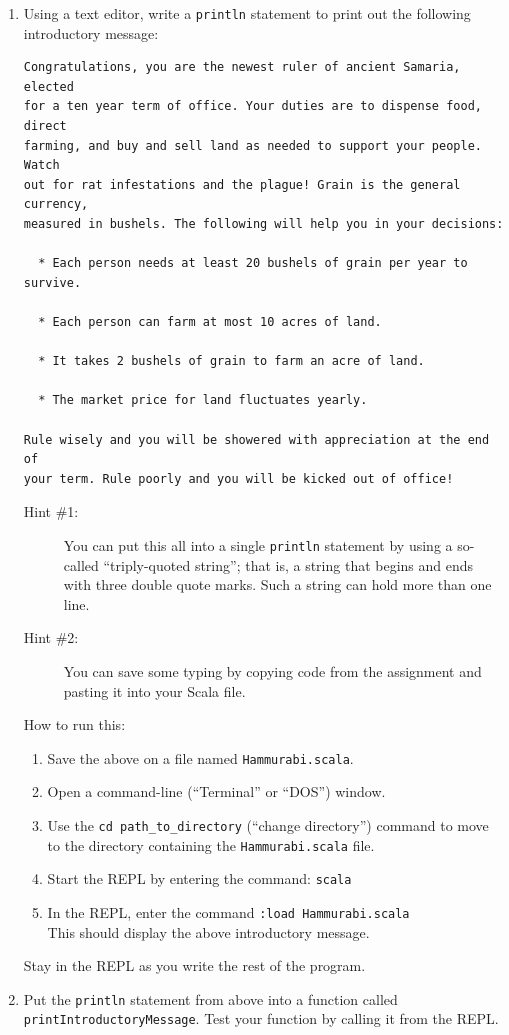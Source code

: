 \documentclass[12pt,a4paper,times]{article}
\begin{document}
\begin{enumerate}
\item
  Using a text editor, write a \texttt{println} statement to print out
  the following introductory message:

\begin{Verbatim}
Congratulations, you are the newest ruler of ancient Samaria, elected
for a ten year term of office. Your duties are to dispense food, direct
farming, and buy and sell land as needed to support your people. Watch
out for rat infestations and the plague! Grain is the general currency,
measured in bushels. The following will help you in your decisions:

  * Each person needs at least 20 bushels of grain per year to survive.

  * Each person can farm at most 10 acres of land.

  * It takes 2 bushels of grain to farm an acre of land.

  * The market price for land fluctuates yearly.

Rule wisely and you will be showered with appreciation at the end of
your term. Rule poorly and you will be kicked out of office!
\end{Verbatim}
\begin{description}
\item[Hint \#1:] You can put this all into a single \texttt{println}
  statement by using a so-called ``triply-quoted string''; that is, a
  string that begins and ends with three double quote marks. Such a
  string can hold more than one line.
\item[Hint \#2:] You can save some typing by copying code from the assignment and pasting it
into your Scala file.
\end{description}
How to run this:
  \begin{enumerate}
  \item
    Save the above on a file named \texttt{Hammurabi.scala}.
  \item
    Open a command-line (``Terminal'' or ``DOS'') window.
  \item
    Use the \texttt{cd\ path\_to\_directory} (``change directory'')
    command to move to the directory containing the
    \texttt{Hammurabi.scala} file.
  \item
    Start the REPL by entering the command: \texttt{scala}
  \item
    In the REPL, enter the command \texttt{:load\ Hammurabi.scala}\\
    This should display the above introductory message.
  \end{enumerate}
  Stay in the REPL as you write the rest of the program.
\item
  Put the \texttt{println} statement from above into a function called
  \texttt{printIntroductoryMessage}. Test your function by calling it
  from the REPL.


\end{enumerate}
\end{document}

